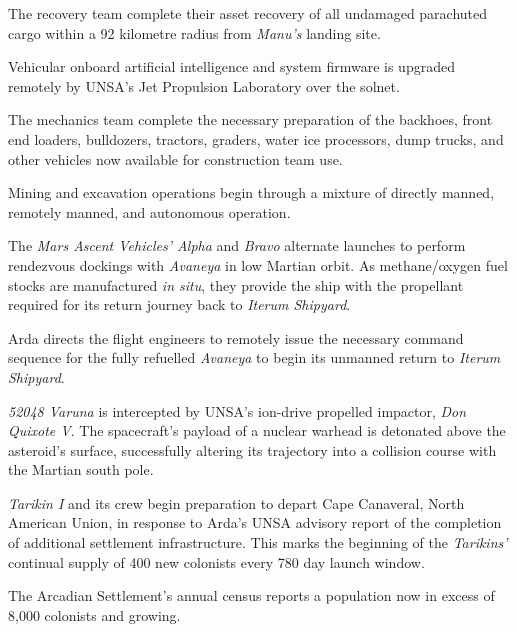 The recovery team complete their asset recovery of all undamaged parachuted cargo within a 92 kilometre radius from {\it Manu's} landing site.
\StopTimelineDate

Vehicular onboard artificial intelligence and system firmware is upgraded remotely by UNSA's Jet Propulsion Laboratory over the solnet.

The mechanics team complete the necessary preparation of the backhoes, front end loaders, bulldozers, tractors, graders, water ice processors, dump trucks, and other vehicles now available for construction team use.

Mining and excavation operations begin through a mixture of directly manned, remotely manned, and autonomous operation.
\StopTimelineDate

The {\it Mars Ascent Vehicles' Alpha} and {\it Bravo} alternate launches to perform rendezvous dockings with {\it Avaneya} in low Martian orbit. As methane/oxygen fuel stocks are manufactured {\it in situ}, they provide the ship with the propellant required for its return journey back to {\it Iterum Shipyard}.
\StopTimelineDate

Arda directs the flight engineers to remotely issue the necessary command sequence for the fully refuelled {\it Avaneya} to begin its unmanned return to {\it Iterum Shipyard}.
\StopTimelineDate

{\it 52048 Varuna} is intercepted by UNSA's ion-drive propelled impactor, {\it Don Quixote V}. The spacecraft's payload of a nuclear warhead is detonated above the asteroid's surface, successfully altering its trajectory into a collision course with the Martian south pole.
\StopTimelineDate

{\it Tarikin I} and its crew begin preparation to depart Cape Canaveral, North American Union, in response to Arda's UNSA advisory report of the completion of additional settlement infrastructure. This marks the beginning of the {\it Tarikins'} continual supply of 400 new colonists every 780 day launch window.
\StopTimelineDate

The Arcadian Settlement's annual census reports a population now in excess of 8,000 colonists and growing.
\StopTimelineDate

